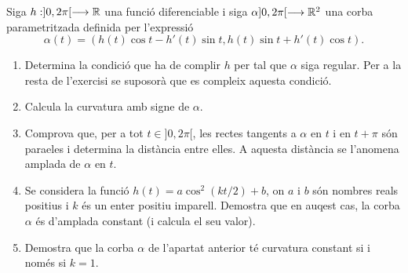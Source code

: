 \documentclass[a4paper, 11pt]{article}
\begin{document}
  \begin{exercise}
    Siga $h: ]0, 2\pi[ \longrightarrow \mathbb{R}$ una funció diferenciable i siga
    $\alpha ]0, 2\pi[ \longrightarrow \mathbb{R}^2$ una corba parametritzada
    definida per l'expressió
    \[
      \alpha(t) = (h(t) \cos t - h'(t) \sin t,
      h(t) \sin t + h'(t) \cos t).
    \]

    \begin{enumerate}[label=(\alph*)]
      \item Determina la condició que ha de complir $h$ per tal que
      $\alpha$ siga regular. Per a la resta de l'exercisi se suposorà que
      es compleix aquesta condició.
      \item Calcula la curvatura amb signe de $\alpha$.
      \item Comprova que, per a tot $t \in ]0, 2\pi[$, les rectes tangents
      a $\alpha$ en $t$ i en $t + \pi$ són para\lgem{}eles i determina la
      distància entre elles. A aquesta distància se l'anomena amplada de
      $\alpha$ en $t$.
      \item Se considera la funció $h(t) = a \cos^2 (kt/2) + b$, on $a$ i
      $b$ són nombres reals positius i $k$ és un enter positiu imparell.
      Demostra que en auqest cas, la corba $\alpha$ és d'amplada constant
      (i calcula el seu valor).
      \item Demostra que la corba $\alpha$ de l'apartat anterior té
      curvatura constant si i només si $k = 1$.
    \end{enumerate}
  \end{exercise}

  \begin{solution}
    
  \end{solution}
\end{document}
